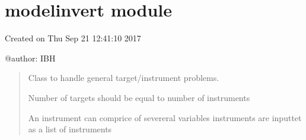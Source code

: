 \documentclass[letterpaper,10pt,english]{sphinxmanual}
\begin{document}
\begin{fulllineitems}
\begin{fulllineitems}
\label{\detokenize{jupyter/modelwidget:modelwidget.visshow.show_on}}
\pysigstartsignatures
{}
\pysigstopsignatures
\end{fulllineitems}


\begin{fulllineitems}
\label{\detokenize{jupyter/modelwidget:modelwidget.visshow.show}}
\pysigstartsignatures
{}
\pysigstopsignatures
\end{fulllineitems}


\end{fulllineitems}


\sphinxstepscope


\section{modelinvert module}
\label{\detokenize{used/modelinvert:module-modelinvert}}\label{\detokenize{used/modelinvert:modelinvert-module}}\label{\detokenize{used/modelinvert::doc}}
\sphinxAtStartPar
Created on Thu Sep 21 12:41:10 2017

\sphinxAtStartPar
@author: IBH
\begin{quote}

\sphinxAtStartPar
Class to handle general target/instrument problems.

\sphinxAtStartPar
Number of targets should be equal to number of instruments

\sphinxAtStartPar
An instrument can comprice of severeral variables
instruments are inputtet as a list of instruments
\end{quote}
\end{document}
